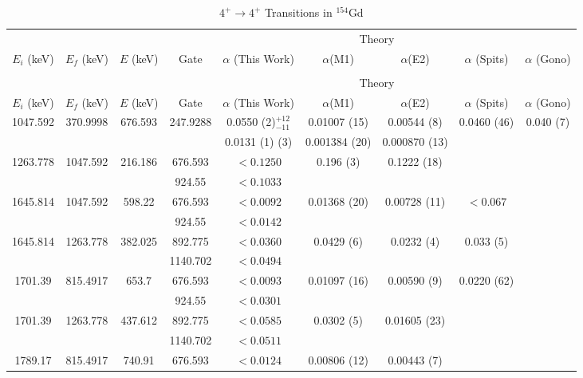 \begin{landscape}
    \small
    \begin{longtable}{c|c|c|c|c|c|c|c|c}
        \caption{$4^+\rightarrow 4^+$ Transitions in $^{154}$Gd}
        \label{tab:154Gd_4_to_4}\\
        \toprule
        &	& 	&  &	& \multicolumn{2}{c|}{Theory}	& & 	\\ 
        $E_i$ (keV)	&	$E_f$ (keV)	& $E$ (keV)	&	Gate &		$\alpha$ (This Work)	& $\alpha$(M1) & $\alpha$(E2) &	$\alpha$ (Spits) & $\alpha$ (Gono)	\\
        \hline
        \endfirsthead
        \caption[]{$4^+\rightarrow 4^+$ Transitions in $^{154}$Gd}\\
        &	& 	&  &	& \multicolumn{2}{c|}{Theory}	& &	\\ 
        $E_i$ (keV)	&	$E_f$ (keV)	& $E$ (keV)	&	Gate &		$\alpha$ (This Work)	& $\alpha$(M1) & $\alpha$(E2) &	$\alpha$ (Spits) & $\alpha$ (Gono)	\\
        \hline
	    \endhead
        1047.592 & 370.9998 &  676.593 & 247.9288 & 0.0550 (2)$^{+12}_{-11}$ & 0.01007 (15) & 0.00544 (8) & 0.0460 (46) & 0.040 (7)\\
        &  &  &  & 0.0131 (1) (3) & 0.001384 (20) & 0.000870 (13) & & \\ \hline
        1263.778 & 1047.592 & 216.186 & 676.593 & $<0.1250$ & 0.196 (3) & 0.1222 (18) &  \\
         &  &  & 924.55 & $<0.1033$ & & &  \\ \hline
        1645.814 & 1047.592 & 598.22 & 676.593 &  $<0.0092$ &  0.01368 (20) & 0.00728 (11) & $<0.067$  \\
         &  &  & 924.55 &  $<0.0142$ & & & \\ \hline
        1645.814 & 1263.778 & 382.025 & 892.775 & $<0.0360$ & 0.0429 (6) & 0.0232 (4) & 0.033 (5) \\
         &  &  & 1140.702 & $<0.0494$ & & & \\ \hline
        1701.39 & 815.4917 & 653.7 & 676.593 & $<0.0093$ & 0.01097 (16) & 0.00590 (9) & 0.0220 (62)  \\
        &  &  & 924.55 & $<0.0301$ & & & \\ \hline
        1701.39 & 1263.778 & 437.612 & 892.775 & $<0.0585$ & 0.0302 (5) & 0.01605 (23) &   \\
        &  &  & 1140.702 & $<0.0511$ & & &   \\ \hline
        1789.17 & 815.4917 & 740.91 & 676.593 & $<0.0124$ & 0.00806 (12) & 0.00443 (7) & \\

\end{longtable}
\end{landscape}
